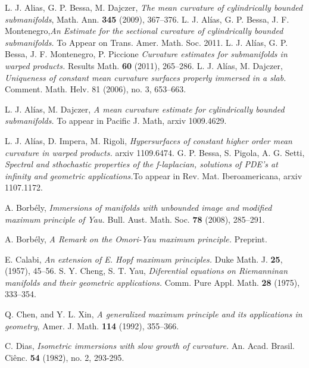 \documentclass[a4paper]{amsart}
\begin{document}
\vspace{.5cm}
\begin{thebibliography}{99}
 L. J. Alias, G. P. Bessa, M. Dajczer,  {\em The mean curvature of cylindrically bounded
submanifolds}, Math. Ann. \textbf{345} (2009), 367--376.
L. J.  Al\'ias, G. P. Bessa, J. F. Montenegro,{\em An Estimate for the sectional curvature of cylindrically bounded submanifolds.} To Appear on Trans. Amer. Math. Soc. 2011.
L. J.  Al\'ias, G. P. Bessa, J. F. Montenegro, P. Piccione {\em Curvature estimates for  submanifolds   in  warped products.} Results Math. \textbf{60} (2011), 265--286.
L. J. Al\'ias, M. Dajczer, {\em Uniqueness of constant mean curvature surfaces properly immersed in a slab.} Comment. Math. Helv. 81 (2006), no. 3, 653--663.

L. J. Al\'ias, M. Dajczer, {\em A mean curvature estimate for cylindrically bounded submanifolds.} To appear in Pacific J. Math, arxiv 1009.4629.

L. J. Al\'ias, D. Impera, M. Rigoli, {\em Hypersurfaces of constant higher order mean curvature in warped products.} arxiv 1109.6474.
 G. P. Bessa, S. Pigola, A. G.  Setti, {\em Spectral and sthochastic properties of the f-laplacian,  solutions of PDE's at infinity and geometric applications.}To appear in Rev. Mat. Iberoamericana,  arxiv 1107.1172.

 A. Borb\'{e}ly, {\em Immersions of manifolds with unbounded image and modified maximum principle of Yau.} Bull. Aust. Math. Soc. \textbf{78} (2008), 285--291.

 A. Borb\'{e}ly, {\em A Remark on the Omori-Yau maximum principle.} Preprint.

 E. Calabi, {\em An extension of E. Hopf maximum principles.} Duke Math. J. \textbf{25}, (1957), 45--56.
S. Y. Cheng, S. T. Yau, {\em  Diferential equations on Riemanninan manifolds and their
geometric applications.} Comm. Pure Appl. Math. \textbf{28} (1975), 333--354.

 Q. Chen,  and Y. L.  Xin, {\em  A generalized maximum principle and its applications in geometry},
Amer. J. Math. \textbf{114} (1992), 355--366. 

 C. Dias, {\em Isometric immersions with slow growth of curvature.} An. Acad. Brasil. Ciênc. \textbf{54} (1982), no. 2, 293-295.


\end{thebibliography}
\end{document}
